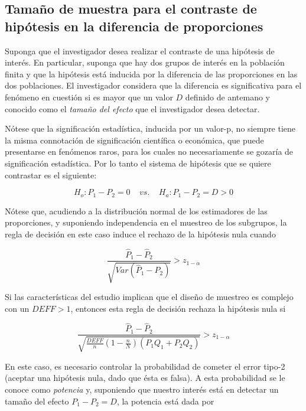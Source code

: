 \documentclass[
  12pt,
]{book}
\begin{document}
\hypertarget{tamauxf1o-de-muestra-para-el-contraste-de-hipuxf3tesis-en-la-diferencia-de-proporciones}{%
\subsection{Tamaño de muestra para el contraste de hipótesis en la diferencia de proporciones}\label{tamauxf1o-de-muestra-para-el-contraste-de-hipuxf3tesis-en-la-diferencia-de-proporciones}}

Suponga que el investigador desea realizar el contraste de una hipótesis de interés. En particular, suponga que hay dos grupos de interés en la población finita y que la hipótesis está inducida por la diferencia de las proporciones en las dos poblaciones. El investigador considera que la diferencia es significativa para el fenómeno en cuestión si es mayor que un valor \(D\) definido de antemano y conocido como el \emph{tamaño del efecto} que el investigador desea detectar.

Nótese que la significación estadística, inducida por un valor-p, no siempre tiene la misma connotación de significación científica o económica, que puede presentarse en fenómenos raros, para los cuales no necesariamente se gozaría de significación estadística. Por lo tanto el sistema de hipótesis que se quiere contrastar es el siguiente:

\[
H_o: P_1-P_2=0 \ \ \ \ \ vs.  \ \ \ \ \ H_a: P_1 -P_2 =D > 0 
\]

Nótese que, acudiendo a la distribución normal de los estimadores de las proporciones, y suponiendo independencia en el muestreo de los subgrupos, la regla de decisión en este caso induce el rechazo de la hipótesis nula cuando

\[
\dfrac{\hat{P}_1-\hat{P}_2}{\sqrt{Var(\hat{P}_1-\hat{P}_2)}} > z_{1-\alpha}
\]

Si las características del estudio implican que el diseño de muestreo es complejo con un \(DEFF > 1\), entonces esta regla de decisión rechaza la hipótesis nula si

\[
\dfrac{\hat{P}_1-\hat{P}_2}{\sqrt{\frac{DEFF}{n}\left(1-\frac{n}{N}\right)(P_1Q_1+P_2Q_2)}} > z_{1-\alpha}
\]

En este caso, es necesario controlar la probabilidad de cometer el error tipo-2 (aceptar una hipótesis nula, dado que ésta es falsa). A esta probabilidad se le conoce como \emph{potencia} y, suponiendo que nuestro interés está en detectar un tamaño del efecto \(P_1 -P_2 =D\), la potencia está dada por
\end{document}
